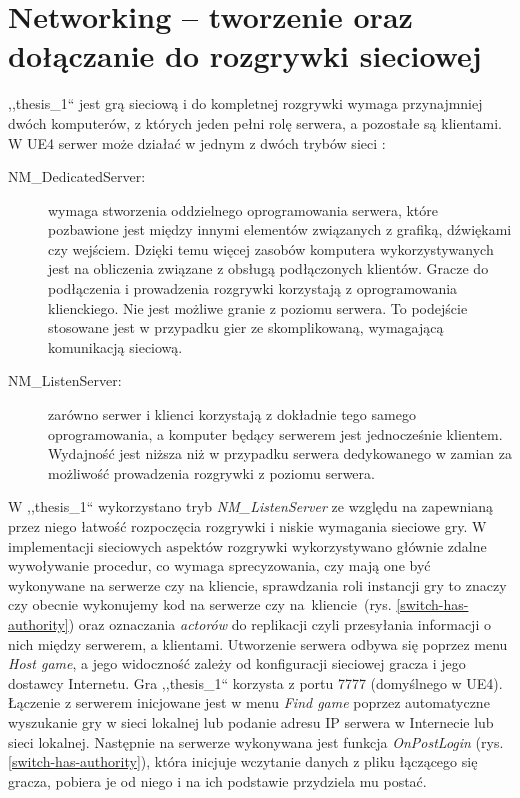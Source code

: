 \documentclass[multip]{SGGW-thesis}
\begin{document}
\section{Networking -- tworzenie oraz dołączanie do rozgrywki sieciowej}
	\label{networking}
,,thesis\_1`` jest grą sieciową i do kompletnej rozgrywki wymaga przynajmniej dwóch komputerów, z których jeden pełni rolę serwera, a pozostałe są klientami. W UE4 serwer może działać w jednym z dwóch trybów sieci \cite{docs-network-modes}:
\begin{description}
\item[NM\_DedicatedServer:]wymaga stworzenia oddzielnego oprogramowania serwera, które pozbawione jest między innymi elementów związanych z grafiką, dźwiękami czy wejściem. Dzięki temu więcej zasobów komputera wykorzystywanych jest na obliczenia związane z obsługą podłączonych klientów. Gracze do podłączenia i prowadzenia rozgrywki korzystają z oprogramowania klienckiego. Nie jest możliwe granie z poziomu serwera. To podejście stosowane jest w przypadku gier ze skomplikowaną, wymagającą komunikacją sieciową.

\item[NM\_ListenServer:]zarówno serwer i klienci korzystają z dokładnie tego samego oprogramowania, a komputer będący serwerem jest jednocześnie klientem. Wydajność jest niższa niż w przypadku serwera dedykowanego w zamian za możliwość prowadzenia rozgrywki z poziomu serwera.
\end{description}

W ,,thesis\_1`` wykorzystano tryb {\em NM\_ListenServer} ze względu na zapewnianą przez niego łatwość rozpoczęcia rozgrywki i niskie wymagania sieciowe gry. W implementacji sieciowych aspektów rozgrywki wykorzystywano głównie zdalne wywoływanie procedur, co wymaga sprecyzowania, czy mają one być wykonywane na serwerze czy na kliencie, sprawdzania roli instancji gry to znaczy czy obecnie wykonujemy kod na serwerze czy na~kliencie~(rys. \ref{switch-has-authority}) oraz oznaczania {\em actorów} do replikacji czyli przesyłania informacji o nich między serwerem, a klientami.
\newline \indent Utworzenie serwera odbywa się poprzez menu {\em Host game}, a jego widoczność zależy od konfiguracji sieciowej gracza i jego dostawcy Internetu. Gra ,,thesis\_1`` korzysta z portu 7777 (domyślnego w UE4).
\newline \indent Łączenie z serwerem inicjowane jest w menu {\em Find game} poprzez automatyczne wyszukanie gry w sieci lokalnej lub podanie adresu IP serwera w Internecie lub sieci lokalnej. Następnie na serwerze wykonywana jest funkcja {\em OnPostLogin} (rys. \ref{switch-has-authority}), która inicjuje wczytanie danych z pliku łączącego się gracza, pobiera je od niego i na ich podstawie przydziela mu postać.
\end{document}

